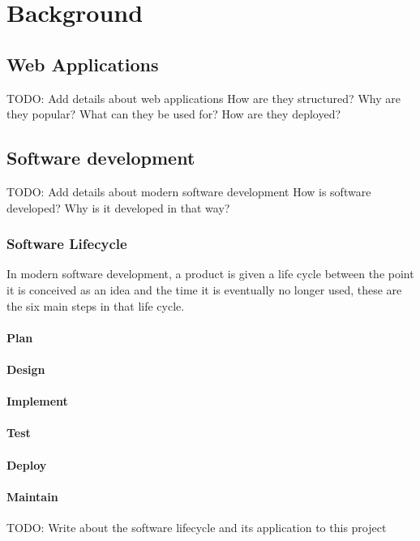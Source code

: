 \chapter{Background}
\label{cha:background}

\section{Web Applications}
TODO: Add details about web applications
How are they structured?
Why are they popular?
What can they be used for?
How are they deployed?
\section{Software development} \label{sec:soft-dev}
TODO: Add details about modern software development
How is software developed?
Why is it developed in that way?

\subsection{Software Lifecycle} \label{sec:soft-life}
In modern software development, a product is given a life cycle between the point it is conceived as an idea and the time it is eventually no longer used, these are the six main steps in that life cycle.
\subsubsection{Plan}
\subsubsection{Design}
\subsubsection{Implement}
\subsubsection{Test}
\subsubsection{Deploy}
\subsubsection{Maintain}
TODO: Write about the software lifecycle and its application to this project
